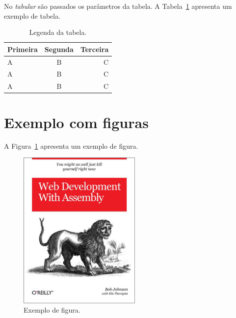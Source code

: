 \documentclass[11pt,twocolumn]{article}
\begin{document}
No \textit{tabular} são passados os parâmetros da tabela. A Tabela~\ref{tabela_exemplo} apresenta um exemplo de tabela.

\begin{table}[h]
  \centering
  \caption{Legenda da tabela.}
  \label{tabela_exemplo}
  \begin{tabular}{ |l||c|r| }
    \hline
    Primeira  & Segunda  & Terceira  \\ \hline\hline
    A & B & C \\ \hline
    A & B & C \\ \hline
    A & B & C \\ \hline
  \end{tabular}
  
\end{table}

\section{Exemplo com figuras}

A Figura~\ref{fig_exemplo} apresenta um exemplo de figura.

\begin{figure}[h]
\centering
  \includegraphics[width=6cm]{exemplo.jpg}
  \caption{Exemplo de figura.}  
  \label{fig_exemplo}
\end{figure}
\end{document}
